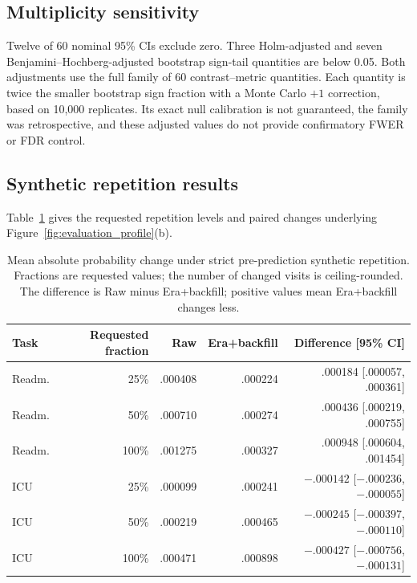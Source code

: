 \documentclass{article}
\newcommand{\ci}{95\% CI}
\begin{document}
\FloatBarrier

\subsection{Multiplicity sensitivity}

Twelve of 60 nominal \ci{}s exclude zero. Three Holm-adjusted and seven
Benjamini--Hochberg-adjusted bootstrap sign-tail quantities are below 0.05.
Both adjustments use the full family of 60 contrast--metric quantities.
Each quantity is twice the smaller bootstrap sign fraction with a Monte Carlo
$+1$ correction, based on 10,000 replicates. Its exact null calibration is not
guaranteed, the family was retrospective, and these adjusted values do not
provide confirmatory FWER or FDR control.

\subsection{Synthetic repetition results}

Table~\ref{tab:copy_forward} gives the requested repetition levels and paired
changes underlying Figure~\ref{fig:evaluation_profile}(b).

\begin{table}[htbp]
  \caption{Mean absolute probability change under strict pre-prediction
  synthetic repetition. Fractions are requested values; the number of changed
  visits is ceiling-rounded. The difference is Raw minus Era+backfill; positive
  values mean Era+backfill changes less.}
  \label{tab:copy_forward}
  \centering
  \small
  \begin{tabular*}{\linewidth}{@{\extracolsep{\fill}}lrrrr@{}}
    \toprule
    Task & Requested fraction & Raw & Era+backfill & Difference [\ci{}] \\
    \midrule
    Readm. & 25\% & .000408 & .000224 & .000184 [.000057, .000361] \\
    Readm. & 50\% & .000710 & .000274 & .000436 [.000219, .000755] \\
    Readm. & 100\% & .001275 & .000327 & .000948 [.000604, .001454] \\
    ICU & 25\% & .000099 & .000241 & $-.000142$ [$-.000236$, $-.000055$] \\
    ICU & 50\% & .000219 & .000465 & $-.000245$ [$-.000397$, $-.000110$] \\
    ICU & 100\% & .000471 & .000898 & $-.000427$ [$-.000756$, $-.000131$] \\
    \bottomrule
  \end{tabular*}
\end{table}
\end{document}
